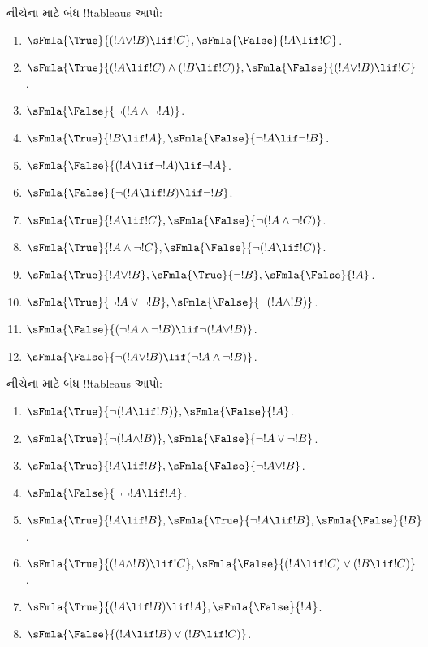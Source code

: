 \documentclass[../../../include/open-logic-section]{subfiles}
\begin{document}
\begin{prob}
નીચેના માટે બંધ !!{tableau}s આપો:
\begin{enumerate}
\item $\sFmla{\True}{(!A \lor !B) \lif !C}, \sFmla{\False}{!A \lif !C}$.
\item $\sFmla{\True}{(!A \lif !C) \land (!B \lif !C)}, \sFmla{\False}{(!A \lor !B) \lif !C}$.
\item $\sFmla{\False}{\lnot(!A \land \lnot !A)}$.
\item $\sFmla{\True}{!B \lif !A}, \sFmla{\False}{\lnot !A \lif \lnot !B}$.
\item $\sFmla{\False}{(!A \lif \lnot !A) \lif \lnot !A}$.
\item $\sFmla{\False}{\lnot(!A \lif !B) \lif \lnot !B}$.
\item $\sFmla{\True}{!A \lif !C}, \sFmla{\False}{\lnot (!A \land \lnot !C)}$.
\item $\sFmla{\True}{!A \land \lnot !C}, \sFmla{\False}{\lnot (!A \lif !C)}$.
\item $\sFmla{\True}{!A \lor !B}, \sFmla{\True}{\lnot !B},
  \sFmla{\False}{!A}$.
\item $\sFmla{\True}{\lnot !A \lor \lnot !B}, \sFmla{\False}{\lnot(!A \land !B)}$.
\item $\sFmla{\False}{(\lnot !A \land \lnot !B) \lif\lnot(!A \lor !B)}$.
\item $\sFmla{\False}{\lnot(!A \lor !B) \lif (\lnot !A \land \lnot !B)}$.
\end{enumerate}
\end{prob}

\begin{prob}
નીચેના માટે બંધ !!{tableau}s આપો:
\begin{enumerate}
\item $\sFmla{\True}{\lnot(!A \lif !B)}, \sFmla{\False}{!A}$.
\item $\sFmla{\True}{\lnot(!A \land !B)}, \sFmla{\False}{\lnot !A \lor \lnot !B}$.
\item $\sFmla{\True}{!A \lif !B}, \sFmla{\False}{\lnot !A \lor !B}$.
\item $\sFmla{\False}{\lnot \lnot !A \lif !A}$.
\item $\sFmla{\True}{!A \lif !B}, \sFmla{\True}{\lnot !A \lif !B}, \sFmla{\False}{!B}$.
\item $\sFmla{\True}{(!A \land !B) \lif !C}, \sFmla{\False}{(!A \lif !C) \lor (!B \lif !C)}$.
\item $\sFmla{\True}{(!A \lif !B) \lif !A}, \sFmla{\False}{!A}$.
\item $\sFmla{\False}{(!A \lif !B) \lor (!B \lif !C)}$.
\end{enumerate}
\end{prob}
\end{document}
